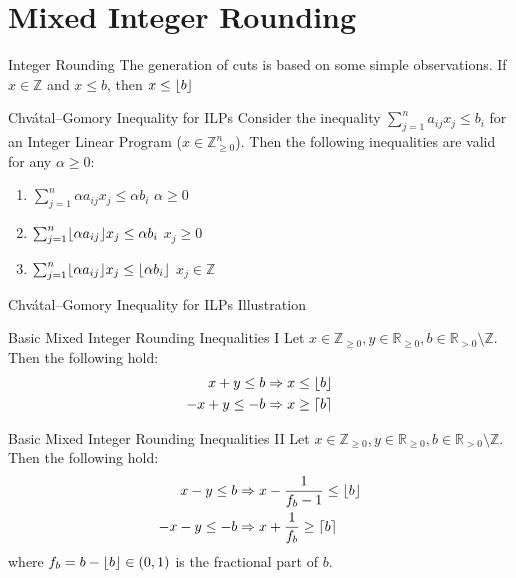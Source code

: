 \section{Mixed Integer Rounding}

\begin{frame}{Integer Rounding}
The generation of cuts is based on some simple observations.
If $x \in \mathbb{Z}$ and $x \leq b$, then $x \leq \lfloor b\rfloor$
\end{frame}

\begin{frame}{Chvátal–Gomory Inequality for ILPs}
Consider the inequality $\sum_{j=1}^n a_{ij} x_j \leq b_i$ for an Integer Linear Program ($x \in \mathbb{Z}_{\geq 0}^n$).
Then the following inequalities are valid for any $\alpha \geq 0$:
\begin{enumerate}
	\item $\sum_{j=1}^n \alpha a_{ij} x_j \leq \alpha b_i$ \hfill $\alpha \geq 0$
	\item $\sum_{j=1}^n \lfloor\alpha a_{ij}\rfloor x_j \leq \alpha b_i$ \hfill $x_j \geq 0$
	\item $\sum_{j=1}^n \lfloor\alpha a_{ij}\rfloor x_j \leq \lfloor \alpha b_i\rfloor$ \hfill $x_j \in \mathbb{Z}$
\end{enumerate}

\end{frame}

\begin{frame}{Chvátal–Gomory Inequality for ILPs}
Illustration %
\end{frame}

\begin{frame}{Basic Mixed Integer Rounding Inequalities I}
Let $x \in \mathbb{Z}_{\geq 0}, y \in \mathbb{R}_{\geq 0}, b \in \mathbb{R}_{>0} \setminus \mathbb{Z}$. Then the following hold:
\begin{align}
x+y \leq b &\Rightarrow x \leq \lfloor b\rfloor \\
-x+y \leq -b &\Rightarrow x \geq \lceil b\rceil
\end{align}
\end{frame}

\begin{frame}{Basic Mixed Integer Rounding Inequalities II}
Let $x \in \mathbb{Z}_{\geq 0}, y \in \mathbb{R}_{\geq 0}, b \in \mathbb{R}_{>0} \setminus \mathbb{Z}$. Then the following hold:
\begin{align}
x-y \leq b &\Rightarrow x - \frac{1}{f_b-1} \leq \lfloor b\rfloor \\
-x-y \leq -b &\Rightarrow x + \frac{1}{f_b} \geq \lceil b\rceil
\end{align}
where $f_b = b - \lfloor b\rfloor \in (0,1)$ is the fractional part of $b$.
\end{frame}

